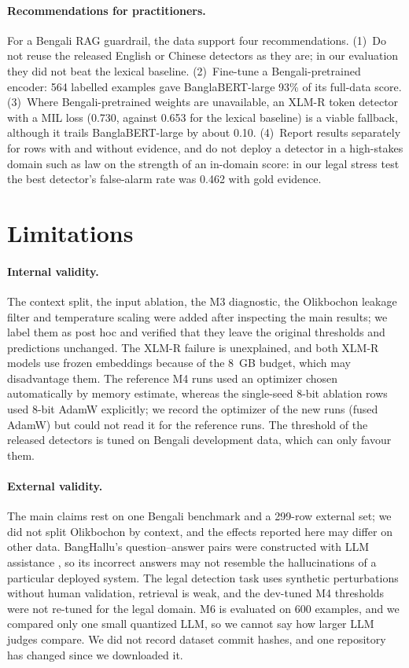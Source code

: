 \documentclass[manuscript,screen,review]{acmart}
\begin{document}
\paragraph{Recommendations for practitioners.}
For a Bengali RAG guardrail, the data support four recommendations. (1)~Do not reuse the released English or Chinese detectors as they are; in our evaluation they did not beat the lexical baseline. (2)~Fine-tune a Bengali-pretrained encoder: 564 labelled examples gave BanglaBERT-large 93\% of its full-data score. (3)~Where Bengali-pretrained weights are unavailable, an XLM-R token detector with a MIL loss (0.730, against 0.653 for the lexical baseline) is a viable fallback, although it trails BanglaBERT-large by about 0.10. (4)~Report results separately for rows with and without evidence, and do not deploy a detector in a high-stakes domain such as law on the strength of an in-domain score: in our legal stress test the best detector's false-alarm rate was 0.462 with gold evidence.

\section{Limitations}\label{sec:validity}
\paragraph{Internal validity.}
The context split, the input ablation, the M3 diagnostic, the Olikbochon leakage filter and temperature scaling were added after inspecting the main results; we label them as post hoc and verified that they leave the original thresholds and predictions unchanged. The XLM-R failure is unexplained, and both XLM-R models use frozen embeddings because of the 8~GB budget, which may disadvantage them. The reference M4 runs used an optimizer chosen automatically by memory estimate, whereas the single-seed 8-bit ablation rows used 8-bit AdamW explicitly; we record the optimizer of the new runs (fused AdamW) but could not read it for the reference runs. The threshold of the released detectors is tuned on Bengali development data, which can only favour them.

\paragraph{External validity.}
The main claims rest on one Bengali benchmark and a 299-row external set; we did not split Olikbochon by context, and the effects reported here may differ on other data. BangHallu's question--answer pairs were constructed with LLM assistance \cite{banghalluRepo}, so its incorrect answers may not resemble the hallucinations of a particular deployed system. The legal detection task uses synthetic perturbations without human validation, retrieval is weak, and the dev-tuned M4 thresholds were not re-tuned for the legal domain. M6 is evaluated on 600 examples, and we compared only one small quantized LLM, so we cannot say how larger LLM judges compare. We did not record dataset commit hashes, and one repository has changed since we downloaded it.
\end{document}
